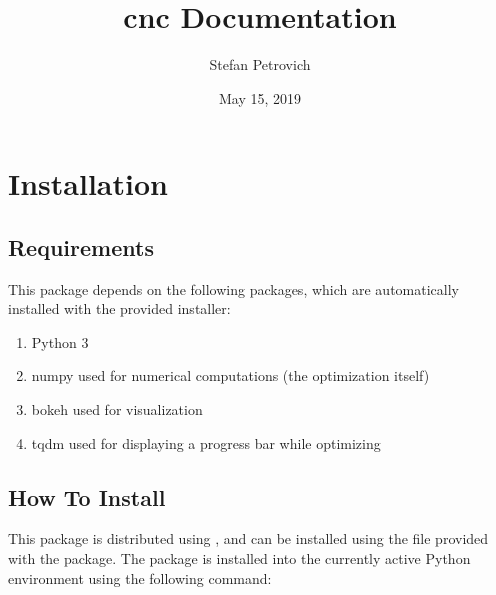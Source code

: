 \documentclass[letterpaper,10pt,english,openany,oneside]{sphinxmanual}
\title{cnc Documentation}
\date{May 15, 2019}
\author{Stefan Petrovich}
\begin{document}
\pagestyle{empty}
\maketitle
\pagestyle{plain}
\sphinxtableofcontents
\pagestyle{normal}
\label{\detokenize{index::doc}}



\chapter{Installation}
\label{\detokenize{installation:installation}}\label{\detokenize{installation::doc}}

\section{Requirements}
\label{\detokenize{installation:requirements}}
This package depends on the following packages, which are automatically
installed with the provided installer:
\begin{enumerate}
\def\theenumi{\arabic{enumi}}
\def\labelenumi{\theenumi .}
\makeatletter\def\p@enumii{\p@enumi \theenumi .}\makeatother
\item {} 
Python 3

\item {} 
numpy \textendash{} used for numerical computations (the optimization itself)

\item {} 
bokeh \textendash{} used for visualization

\item {} 
tqdm \textendash{} used for displaying a progress bar while optimizing

\end{enumerate}


\section{How To Install}
\label{\detokenize{installation:how-to-install}}
This package is distributed using , and can be installed using the
 file provided with the package. The package is installed into the
currently active Python environment using the following command:

%
\begin{sphinxVerbatim}[commandchars=\\\{\}]
  
\end{sphinxVerbatim}
\end{document}
